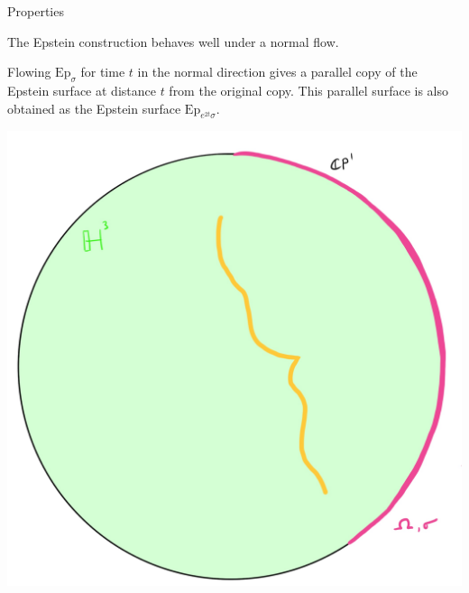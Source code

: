 \documentclass[professionalfont]{beamer}
\begin{document}
\begin{frame}{Properties}

The Epstein construction behaves well under a normal flow. 

Flowing $\mathrm{Ep}_\sigma$ for time $t$ in the normal direction gives a parallel copy of the Epstein surface at distance $t$ from the original copy. This parallel surface is also obtained as the Epstein surface $\mathrm{Ep}_{e^{2t}\sigma}$.

\centering\includegraphics[scale=0.09]{Parallel-2.jpg}

\end{frame}


\end{document}
